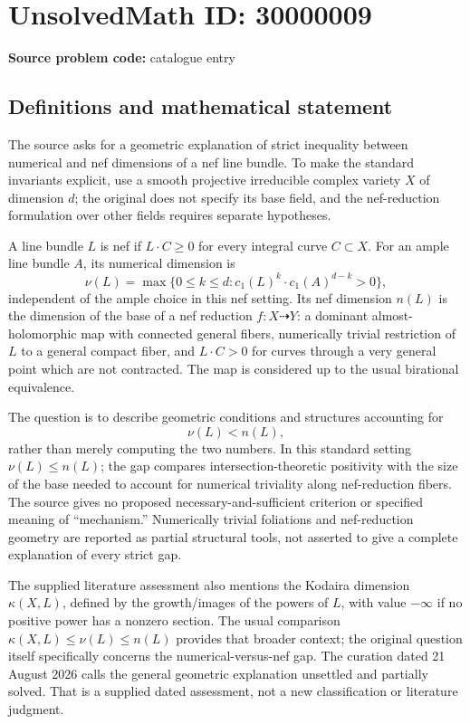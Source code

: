 \documentclass[11pt]{article}
\begin{document}
\section*{UnsolvedMath ID: 30000009}
\textbf{Source problem code:} catalogue entry
\subsection{Definitions and mathematical statement}
The source asks for a geometric explanation of strict inequality between numerical and nef dimensions of a nef line bundle. To make the standard invariants explicit, use a smooth projective irreducible complex variety \(X\) of dimension \(d\); the original does not specify its base field, and the nef-reduction formulation over other fields requires separate hypotheses.

A line bundle \(L\) is nef if \(L\cdot C\geq0\) for every integral curve \(C\subset X\). For an ample line bundle \(A\), its numerical dimension is
\[
 \nu(L)=\max\{0\leq k\leq d:c_1(L)^k\cdot c_1(A)^{d-k}>0\},
\]
independent of the ample choice in this nef setting. Its nef dimension \(n(L)\) is the dimension of the base of a nef reduction \(f:X\dashrightarrow Y\): a dominant almost-holomorphic map with connected general fibers, numerically trivial restriction of \(L\) to a general compact fiber, and \(L\cdot C>0\) for curves through a very general point which are not contracted. The map is considered up to the usual birational equivalence.

The question is to describe geometric conditions and structures accounting for
\[
 \nu(L)<n(L),
\]
rather than merely computing the two numbers. In this standard setting \(\nu(L)\leq n(L)\); the gap compares intersection-theoretic positivity with the size of the base needed to account for numerical triviality along nef-reduction fibers. The source gives no proposed necessary-and-sufficient criterion or specified meaning of ``mechanism.'' Numerically trivial foliations and nef-reduction geometry are reported as partial structural tools, not asserted to give a complete explanation of every strict gap.

The supplied literature assessment also mentions the Kodaira dimension \(\kappa(X,L)\), defined by the growth/images of the powers of \(L\), with value \(-\infty\) if no positive power has a nonzero section. The usual comparison \(\kappa(X,L)\leq\nu(L)\leq n(L)\) provides that broader context; the original question itself specifically concerns the numerical-versus-nef gap. The curation dated 21 August 2026 calls the general geometric explanation unsettled and partially solved. That is a supplied dated assessment, not a new classification or literature judgment.
\end{document}
